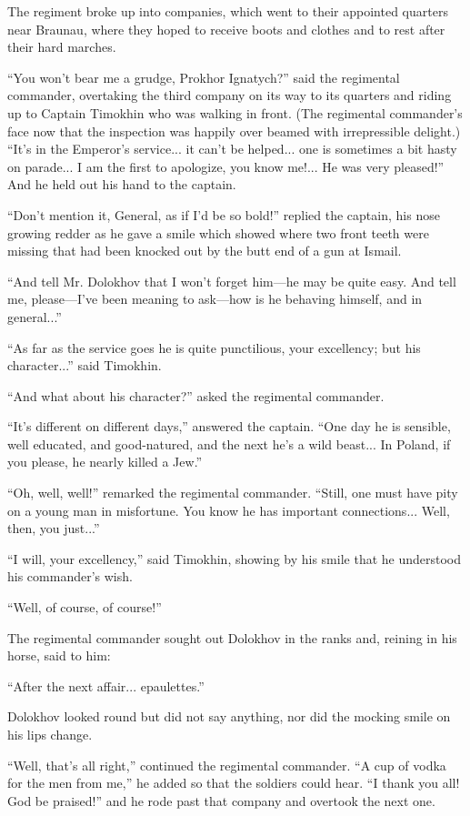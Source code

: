 The regiment broke up into companies, which went to their
appointed quarters near Braunau, where they hoped to receive
boots and clothes and to rest after their hard marches.

``You won't bear me a grudge, Prokhor Ignatych?'' said the
regimental commander, overtaking the third company on its way to
its quarters and riding up to Captain Timokhin who was walking in
front. (The regimental commander's face now that the inspection
was happily over beamed with irrepressible delight.) ``It's in
the Emperor's service... it can't be helped... one is sometimes a
bit hasty on parade... I am the first to apologize, you know
me!... He was very pleased!'' And he held out his hand to the
captain.

``Don't mention it, General, as if I'd be so bold!'' replied the
captain, his nose growing redder as he gave a smile which showed
where two front teeth were missing that had been knocked out by
the butt end of a gun at Ismail.

``And tell Mr. Dolokhov that I won't forget him---he may be quite
easy.  And tell me, please---I've been meaning to ask---how is he
behaving himself, and in general...''

``As far as the service goes he is quite punctilious, your
excellency; but his character...'' said Timokhin.

``And what about his character?'' asked the regimental commander.

``It's different on different days,'' answered the captain. ``One
day he is sensible, well educated, and good-natured, and the next
he's a wild beast... In Poland, if you please, he nearly killed a
Jew.''

``Oh, well, well!'' remarked the regimental commander. ``Still,
one must have pity on a young man in misfortune. You know he has
important connections... Well, then, you just...''

``I will, your excellency,'' said Timokhin, showing by his smile
that he understood his commander's wish.

``Well, of course, of course!''

The regimental commander sought out Dolokhov in the ranks and,
reining in his horse, said to him:

``After the next affair... epaulettes.''

Dolokhov looked round but did not say anything, nor did the
mocking smile on his lips change.

``Well, that's all right,'' continued the regimental
commander. ``A cup of vodka for the men from me,'' he added so
that the soldiers could hear. ``I thank you all! God be
praised!'' and he rode past that company and overtook the next
one.

